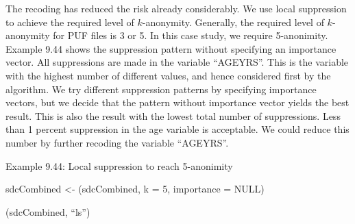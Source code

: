 \documentclass[letterpaper,10pt,english]{sphinxmanual}
\begin{document}

The recoding has reduced the risk already considerably. We use local
suppression to achieve the required level of \(k\)-anonymity.
Generally, the required level of \(k\)-anonymity for PUF files is 3
or 5. In this case study, we require 5-anonimity. Example 9.44 shows the
suppression pattern without specifying an importance vector. All
suppressions are made in the variable “AGEYRS”. This is the variable
with the highest number of different values, and hence considered first
by the algorithm. We try different suppression patterns by specifying
importance vectors, but we decide that the pattern without importance
vector yields the best result. This is also the result with the lowest
total number of suppressions. Less than 1 percent suppression in the age
variable is acceptable. We could reduce this number by further recoding
the variable “AGEYRS”.

Example 9.44: Local suppression to reach 5-anonimity

\begin{DUlineblock}{0em}
\item[] 
\item[] sdcCombined \textless{}- (sdcCombined, k = 5, importance =
NULL)
\item[] 
\item[] (sdcCombined, “ls”)
\end{DUlineblock}

\begin{DUlineblock}{0em}
\item[] 
\item[] 
\item[] 
\item[] 
\item[] 
\item[] 
\item[] 
\item[] 
\end{DUlineblock}
\end{document}
